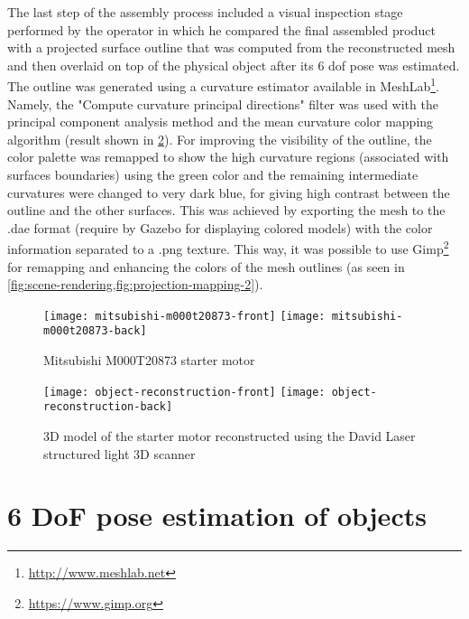 The last step of the assembly process included a visual inspection stage performed by the operator in which he compared the final assembled product with a projected surface outline that was computed from the reconstructed mesh and then overlaid on top of the physical object after its 6 \gls{dof} pose was estimated. The outline was generated using a curvature estimator available in MeshLab\footnote{\url{http://www.meshlab.net}}. Namely, the "Compute curvature principal directions" filter was used with the principal component analysis method and the mean curvature color mapping algorithm (result shown in \cref{fig:object-reconstruction}). For improving the visibility of the outline, the color palette was remapped to show the high curvature regions (associated with surfaces boundaries) using the green color and the remaining intermediate curvatures were changed to very dark blue, for giving high contrast between the outline and the other surfaces. This was achieved by exporting the mesh to the .dae format (require by Gazebo for displaying colored models) with the color information separated to a .png texture. This way, it was possible to use Gimp\footnote{\url{https://www.gimp.org}} for remapping and enhancing the colors of the mesh outlines (as seen in \cref{fig:scene-rendering,fig:projection-mapping-2}).

\begin{figure}[!ht]
	\centering
	\texttt{[image: mitsubishi-m000t20873-front]}
	\hspace{1em}
	\texttt{[image: mitsubishi-m000t20873-back]}
	\caption{Mitsubishi M000T20873 starter motor}
	\label{fig:starter-motor}
	\vspace{-0.5em}
\end{figure}
\vspace{-0.5em}

\begin{figure}[!ht]
	\centering
	\texttt{[image: object-reconstruction-front]}
	\hspace{1em}
	\texttt{[image: object-reconstruction-back]}
	\caption{3D model of the starter motor reconstructed using the David Laser structured light 3D scanner}
	\label{fig:object-reconstruction}
	\vspace{-0.5em}
\end{figure}
\vspace{-0.5em}


\section{6 DoF pose estimation of objects}\label{sec:pose-estimation}


